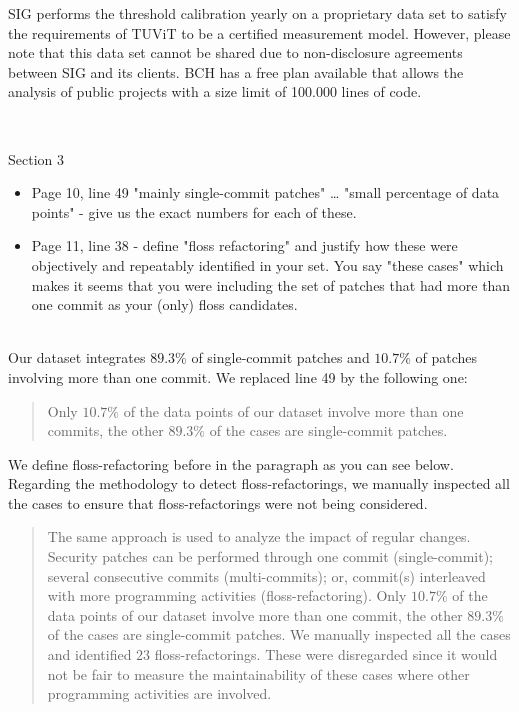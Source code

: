 \documentclass[11pt,fleqn]{article}
\newcommand{\eline}{\vspace*{.75\baselineskip}}
\newcommand{\Referee}[1]{\eline \noindent {\bf Reviewer comment #1:} \\}
\newcommand{\Us}{\eline \noindent {\bf Response:}\\}
\newenvironment{revcomment}[1][]
{\Referee{#1}\begin{rcomment}}
{\end{rcomment}}
\begin{document}
SIG performs the threshold calibration
yearly on a proprietary data set to satisfy the requirements of TUViT to
be a certified measurement model. However, please note that this data set 
cannot be shared due to non-disclosure agreements between SIG and its 
clients. BCH has a free plan available that allows the analysis of public
projects with a size limit of 100.000 lines of code.


\begin{revcomment}[2.13]
    Section 3\\
    \begin{itemize}
        \item Page 10, line 49 "mainly single-commit patches" … "small percentage 
        of data points" - give us the exact numbers for each of these.  
        \item Page 11, line 38 - define "floss refactoring" and justify how these were objectively 
        and repeatably identified in your set. You say "these cases" which makes 
        it seems that you were including the set of patches that had more than one 
        commit as your (only) floss candidates.  
    \end{itemize}
\end{revcomment}

\Us Our dataset integrates $89.3\%$ of single-commit patches and 
$10.7\%$ of patches involving more than one commit. We replaced 
line 49 by the following one:

\begin{quote}
    Only $10.7\%$ of the data points 
of our dataset involve more than one commits, the other
$89.3\%$ of the cases are single-commit patches.
\end{quote}

We define floss-refactoring before in the paragraph
as you can see below. Regarding the methodology to detect floss-refactorings, 
we manually inspected all the cases to ensure that 
floss-refactorings were not being considered. 

\begin{quote}
    The same approach is used to analyze the impact of regular 
    changes. Security patches can be performed through one commit (single-commit); 
    several consecutive commits (multi-commits); or, commit(s) interleaved with more 
    programming activities (floss-refactoring). Only $10.7\%$ of the data points 
    of our dataset involve more than one commit, the other
    $89.3\%$ of the cases are single-commit patches. We manually 
    inspected all the cases and identified $23$ floss-refactorings. 
    These were disregarded since it would not be fair to measure the 
    maintainability of these cases where other programming activities 
    are involved.
\end{quote}
\end{document}
